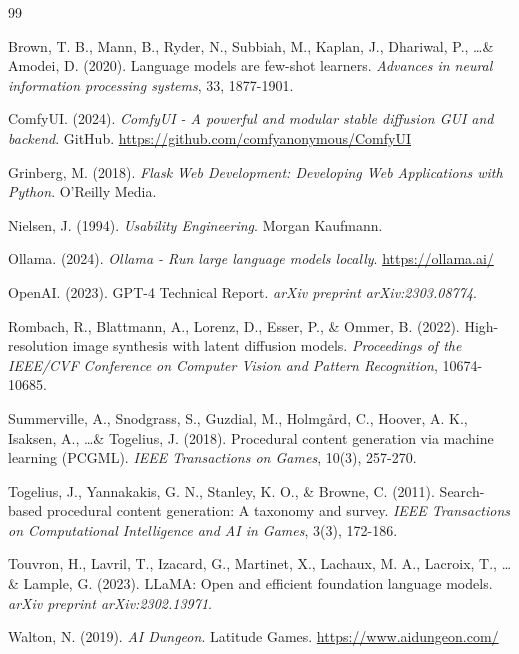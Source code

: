\documentclass[12pt,a4paper]{article}
\begin{document}
    \begin{thebibliography}{99}

    Brown, T. B., Mann, B., Ryder, N., Subbiah, M., Kaplan, J., Dhariwal, P., \ldots \& Amodei, D. (2020). Language models are few-shot learners. \textit{Advances in neural information processing systems}, 33, 1877-1901.

    ComfyUI. (2024). \textit{ComfyUI - A powerful and modular stable diffusion GUI and backend}. GitHub. \url{https://github.com/comfyanonymous/ComfyUI}

    Grinberg, M. (2018). \textit{Flask Web Development: Developing Web Applications with Python}. O'Reilly Media.

    Nielsen, J. (1994). \textit{Usability Engineering}. Morgan Kaufmann.

    Ollama. (2024). \textit{Ollama - Run large language models locally}. \url{https://ollama.ai/}

    OpenAI. (2023). GPT-4 Technical Report. \textit{arXiv preprint arXiv:2303.08774}.

Rombach, R., Blattmann, A., Lorenz, D., Esser, P., \& Ommer, B. (2022). High-resolution image synthesis with latent diffusion models. \textit{Proceedings of the IEEE/CVF Conference on Computer Vision and Pattern Recognition}, 10674-10685.

    Summerville, A., Snodgrass, S., Guzdial, M., Holmgård, C., Hoover, A. K., Isaksen, A., \ldots \& Togelius, J. (2018). Procedural content generation via machine learning (PCGML). \textit{IEEE Transactions on Games}, 10(3), 257-270.

Togelius, J., Yannakakis, G. N., Stanley, K. O., \& Browne, C. (2011). Search-based procedural content generation: A taxonomy and survey. \textit{IEEE Transactions on Computational Intelligence and AI in Games}, 3(3), 172-186.

Touvron, H., Lavril, T., Izacard, G., Martinet, X., Lachaux, M. A., Lacroix, T., \ldots \& Lample, G. (2023). LLaMA: Open and efficient foundation language models. \textit{arXiv preprint arXiv:2302.13971}.

    Walton, N. (2019). \textit{AI Dungeon}. Latitude Games. \url{https://www.aidungeon.com/}

    \end{thebibliography}
\end{document}
